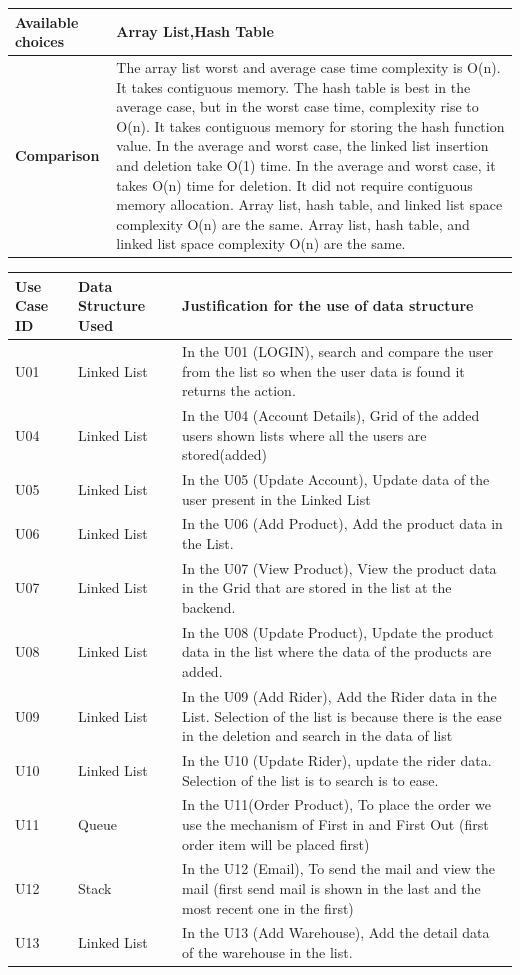 \documentclass[12pt,a4paper]{report}
\begin{document}
\begin{center}
\begin{tabular}{ | m{4cm}|m{12cm}| }
 \\ \hline
\textbf{Available choices}& Array List,Hash Table \\ \hline
\textbf{Comparison}&
The array list worst and average case time complexity is O(n). It takes contiguous memory. The hash table is best in the average case, but in the worst case time, complexity rise to O(n). It takes contiguous memory for storing the hash function value. In the average and worst case, the linked list insertion and deletion take O(1) time. In the average and worst case, it takes O(n) time for deletion. It did not require contiguous memory allocation. 
Array list, hash table, and linked list space complexity O(n) are the same.
Array list, hash table, and linked list space complexity O(n) are the same.


 \\ \hline



\end{tabular}
\end{center}
\newpage 
\begin{tabular}{ | m{2cm} | m{3cm}|m{9cm}| } \hline
\textbf{ Use Case ID}&	\textbf{Data Structure Used}	& \textbf{Justification for the use of data structure}  \\ \hline
U01 &Linked List& In the U01 (LOGIN), search and compare the user from the list so when the user data is found it returns the action.\\ \hline
U04 &Linked List& In the U04 (Account Details), Grid of the added users shown lists where all the users are stored(added) \\ \hline
U05 &Linked List& In the U05 (Update Account), Update data of  the user present in the Linked List\\ \hline
U06 &Linked List&In the U06 (Add Product), Add the product data in the List. \\ \hline
U07 &Linked List&In the U07 (View Product), View the product data in the Grid that are stored in the list at the backend. \\ \hline
U08 &Linked List& In the U08 (Update Product), Update the product data in the list where the data of the products are added.\\ \hline
U09 &Linked List& In the U09 (Add Rider), Add the Rider data in the List. Selection of the list is because there is the ease in the deletion and search in the data of list\\ \hline
U10 &Linked List&In the U10 (Update Rider), update the rider data. Selection of the list is to search is to ease. \\ \hline
U11 &Queue      & In the U11(Order Product), To place the order we use the mechanism of First in and First Out (first order item will be placed first)\\ \hline
U12 &Stack      & In the U12 (Email), To send the mail and view the mail (first send mail is shown in the last and the most recent one in the first)\\ \hline
U13 &Linked List& In the U13 (Add Warehouse), Add the detail data of the warehouse in the list.\\ \hline
\end{tabular}
\end{document}
